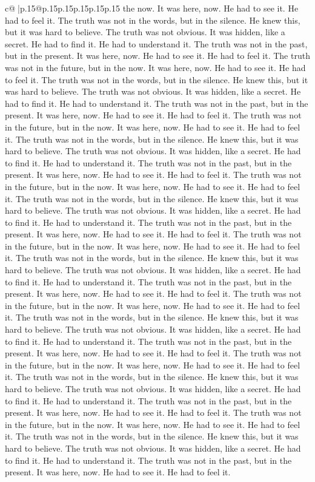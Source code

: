 \documentclass{article}
\begin{document}
{\begin{supertabular}{c@{$\;$}|p{.15\linewidth}@{}p{.15\linewidth}p{.15\linewidth}p{.15\linewidth}p{.15\linewidth}p{.15\linewidth}}
{{{the now. It was here, now. He had to see it. He had to feel it. The truth was not in the words, but in the silence. He knew this, but it was hard to believe. The truth was not obvious. It was hidden, like a secret. He had to find it. He had to understand it. The truth was not in the past, but in the present. It was here, now. He had to see it. He had to feel it. The truth was not in the future, but in the now. It was here, now. He had to see it. He had to feel it. The truth was not in the words, but in the silence. He knew this, but it was hard to believe. The truth was not obvious. It was hidden, like a secret. He had to find it. He had to understand it. The truth was not in the past, but in the present. It was here, now. He had to see it. He had to feel it. The truth was not in the future, but in the now. It was here, now. He had to see it. He had to feel it. The truth was not in the words, but in the silence. He knew this, but it was hard to believe. The truth was not obvious. It was hidden, like a secret. He had to find it. He had to understand it. The truth was not in the past, but in the present. It was here, now. He had to see it. He had to feel it. The truth was not in the future, but in the now. It was here, now. He had to see it. He had to feel it. The truth was not in the words, but in the silence. He knew this, but it was hard to believe. The truth was not obvious. It was hidden, like a secret. He had to find it. He had to understand it. The truth was not in the past, but in the present. It was here, now. He had to see it. He had to feel it. The truth was not in the future, but in the now. It was here, now. He had to see it. He had to feel it. The truth was not in the words, but in the silence. He knew this, but it was hard to believe. The truth was not obvious. It was hidden, like a secret. He had to find it. He had to understand it. The truth was not in the past, but in the present. It was here, now. He had to see it. He had to feel it. The truth was not in the future, but in the now. It was here, now. He had to see it. He had to feel it. The truth was not in the words, but in the silence. He knew this, but it was hard to believe. The truth was not obvious. It was hidden, like a secret. He had to find it. He had to understand it. The truth was not in the past, but in the present. It was here, now. He had to see it. He had to feel it. The truth was not in the future, but in the now. It was here, now. He had to see it. He had to feel it. The truth was not in the words, but in the silence. He knew this, but it was hard to believe. The truth was not obvious. It was hidden, like a secret. He had to find it. He had to understand it. The truth was not in the past, but in the present. It was here, now. He had to see it. He had to feel it. The truth was not in the future, but in the now. It was here, now. He had to see it. He had to feel it. The truth was not in the words, but in the silence. He knew this, but it was hard to believe. The truth was not obvious. It was hidden, like a secret. He had to find it. He had to understand it. The truth was not in the past, but in the present. It was here, now. He had to see it. He had to feel it. }}}
\end{supertabular}}
\end{document}
